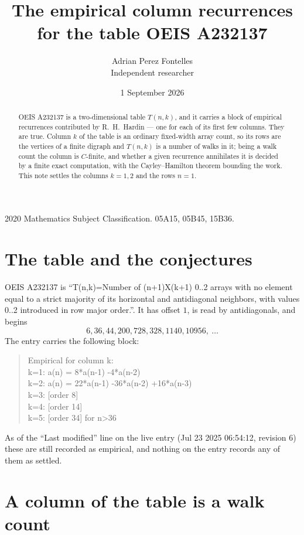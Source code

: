 \documentclass[11pt,a4paper]{article}
\title{The empirical column recurrences for the table OEIS A232137}
\author{Adrian Perez Fontelles\\ \small Independent researcher}
\date{1 September 2026}
\theoremstyle{plain}
\theoremstyle{definition}
\begin{document}
\maketitle

\begin{abstract}
OEIS A232137 is a two-dimensional table $T(n,k)$, and it carries a block of empirical
recurrences contributed by R.~H.~Hardin --- one for each of its first few columns. They are
true. Column $k$ of the table is an ordinary fixed-width array count, so its rows are the
vertices of a finite digraph and $T(n,k)$ is a number of walks in it; being a walk count the
column is $C$-finite, and whether a given recurrence annihilates it is decided by a finite
exact computation, with the Cayley--Hamilton theorem bounding the work. This note settles the columns $k=1, 2$ and the rows $n=1$.
\end{abstract}

\noindent\small 2020 Mathematics Subject Classification. 05A15, 05B45, 15B36.\normalsize

\section{The table and the conjectures}

OEIS A232137 is ``T(n,k)=Number of (n+1)X(k+1) 0..2 arrays with no element equal to a strict majority of its horizontal and antidiagonal neighbors, with values 0..2 introduced in row major order.''. It has offset $1$, is
read by antidiagonals, and begins
\[
6, 36, 44, 200, 728, 328, 1140, 10956,\ \dots
\]
The entry carries the following block:
\begin{quote}\small
Empirical for column k:\\
k=1: a(n) = 8*a(n-1) -4*a(n-2)\\
k=2: a(n) = 22*a(n-1) -36*a(n-2) +16*a(n-3)\\
k=3: [order 8]\\
k=4: [order 14]\\
k=5: [order 34] for n>36\\
\end{quote}
As of the ``Last modified'' line on the live entry (Jul 23 2025 06:54:12, revision 6) these are still
recorded as empirical, and nothing on the entry records any of them as settled.

\section{A column of the table is a walk count}
\end{document}
